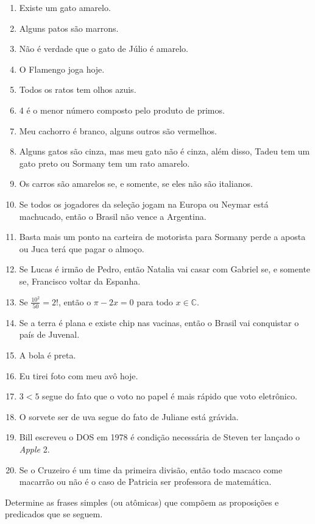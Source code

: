 \begin{enumerate}
	\item Existe um gato amarelo.
	\item Alguns patos são marrons.
	\item Não é verdade que o gato de Júlio é amarelo.
	\item O Flamengo joga hoje.
	\item Todos os ratos tem olhos azuis.
	\item 4 é o menor número composto pelo produto de primos.
	\item Meu cachorro é branco, alguns outros são vermelhos.
	\item Alguns gatos são cinza, mas meu gato não é cinza, além disso, Tadeu tem um gato preto ou Sormany tem um rato amarelo.
	\item Os carros são amarelos se, e somente, se eles não são italianos.
	\item Se todos os jogadores da seleção jogam na Europa ou Neymar está machucado, então o Brasil não vence a Argentina.
	\item Basta mais um ponto na carteira de motorista para Sormany perde a aposta ou Juca terá que pagar o almoço.
	\item Se Lucas é irmão de Pedro, então Natalia vai casar com Gabriel se, e somente se, Francisco voltar da Espanha.
	\item Se $\frac{10^2}{50} = 2!$, então o $\pi - 2x = 0$ para todo $x \in \mathbb{C}$.
	\item Se a terra é plana e existe chip nas vacinas, então o Brasil vai conquistar o país de Juvenal. 
	\item A bola é preta.
	\item Eu tirei foto com meu avô hoje.
	\item $3 < 5$ segue do fato que o  voto no papel é mais rápido que voto eletrônico.
	\item O sorvete ser de uva segue do fato de Juliane está grávida.
	\item Bill escreveu o DOS em 1978 é condição necessária de Steven ter lançado o \textit{Apple} 2.
	\item Se o Cruzeiro é um time da primeira divisão, então todo macaco come macarrão ou não é o caso de Patricia ser professora de matemática. 
\end{enumerate}

\begin{exercise}
	Determine as frases simples (ou atômicas) que compõem as proposições e predicados que se seguem.
\end{exercise}

